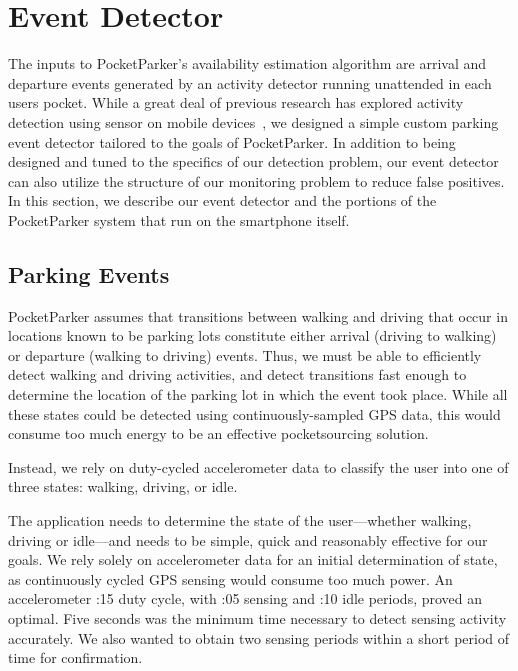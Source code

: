 \section{Event Detector}
\label{sec-detector}

The inputs to PocketParker's availability estimation algorithm are arrival
and departure events generated by an activity detector running unattended in
each users pocket. While a great deal of previous research has explored
activity detection using sensor on mobile devices~\cite{FIXME}, we designed a
simple custom parking event detector tailored to the goals of PocketParker.
In addition to being designed and tuned to the specifics of our detection
problem, our event detector can also utilize the structure of our monitoring
problem to reduce false positives. In this section, we describe our event
detector and the portions of the PocketParker system that run on the
smartphone itself.

\subsection{Parking Events}
\label{subsec-goals}

PocketParker assumes that transitions between walking and driving that occur
in locations known to be parking lots constitute either arrival (driving to
walking) or departure (walking to driving) events. Thus, we must be able to
efficiently detect walking and driving activities, and detect transitions
fast enough to determine the location of the parking lot in which the event
took place. While all these states could be detected using
continuously-sampled GPS data, this would consume too much energy to be an
effective pocketsourcing solution.

Instead, we rely on duty-cycled accelerometer data to classify the user into
one of three states: walking, driving, or idle.

The application needs to determine the state of the user---whether walking,
driving or idle---and needs to be simple, quick and reasonably effective
for our goals. We rely solely on accelerometer data for an initial
determination of state, as continuously cycled GPS sensing would consume too
much power. An accelerometer :15 duty cycle, with :05 sensing and :10 idle
periods, proved an optimal. Five seconds was the minimum time necessary to
detect sensing activity accurately. We also wanted to obtain two sensing
periods within a short period of time for confirmation.


